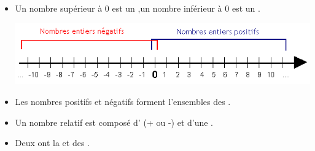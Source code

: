 \documentclass[xcolor={dvipsnames}]{beamer}
\begin{document}
\begin{frame}
	\begin{mydefs}
		\begin{itemize}
			\item Un nombre supérieur à 0 est un ,\pause un nombre inférieur à 0 est un .
			
			\begin{center}
				\includegraphics[scale=0.5]{relatifs}\pause
			\end{center}
			
			\item Les nombres positifs et négatifs forment l'ensembles des .\pause
			
			\item Un nombre relatif est composé d' (+ ou -) et d'une .\pause
			
			\item Deux  ont la  et des . 
			
			
		\end{itemize}
	\end{mydefs}
	
\end{frame}
\end{document}

